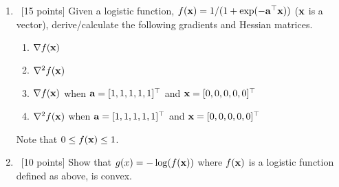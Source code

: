 \documentclass[12pt, fullpage,letterpaper]{article}
\begin{document}
\begin{enumerate}
\item~[15 points] Given a logistic function, $f({\bf x}) = 1/(1+\exp(-{\bf a}^\top {\bf x}))$ (${\bf x}$ is a vector), derive/calculate the following gradients and Hessian matrices.  
\begin{enumerate}
\item $\nabla f({\bf x})$
\item $\nabla^2 f({\bf x})$
\item $\nabla f({\bf x})$ when ${\bf a} = [1,1,1,1,1]^\top$ and ${\bf x} = [0,0,0,0,0]^\top$
\item $\nabla^2 f({\bf x})$  when ${\bf a} = [1,1,1,1,1]^\top$ and ${\bf x} = [0,0,0,0,0]^\top$
\end{enumerate}
Note that $0 \le f({\bf x}) \le 1$.

\item~[10 points] Show that $g(x) = -\log(f({\bf x}))$ where $f({\bf x})$ is a logistic function defined as above, is convex. 


\end{enumerate}
\end{document}
